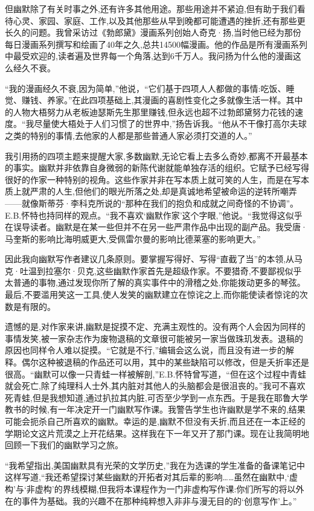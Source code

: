 但幽默除了有关时事之外,还有许多其他用途。那些用途并不紧迫,但有助于我们看待心灵、家园、家庭、工作,以及其他那些从早到晚都可能遭遇的挫折,还有那些更长久的问题。我曾采访过《勃郎黛》漫画系列创始人奇克·扬,当时他已经为那份每日漫画系列撰写和绘画了40年之久,总共14500幅漫画。他的作品是所有漫画系列中最受欢迎的,读者遍及世界每一个角落,达到6千万人。我问扬为什么他的漫画这么经久不衰。

“我的漫画经久不衰,因为简单,”他说，“它们基于四项人人都做的事情:吃饭、睡觉、赚钱、养家。”在此四项基础上,其漫画的喜剧性变化之多就像生活一样。其中的人物大梧努力从老板迪瑟斯先生那里赚钱,但永远也超不过勃郎黛努力花钱的速度。“我尽量使大梧处于人们习惯了的世界中,”扬告诉我。“他从不干像打高尔夫球之类的特别的事情,去他家的人都是那些普通人家必须打交道的人。”

我引用扬的四项主题来提醒大家,多数幽默,无论它看上去多么奇妙,都离不开最基本的事实。幽默并非依靠自身微弱的新陈代谢就能单独存活的组织。它赋予已经写得很好的作家一种特别的视角。这些作家并非在写本质上就可笑的人生，而是在写本质上就严肃的人生,但他们的眼光所落之处,却是真诚地希望被命运的逆转所嘲弄——就像斯蒂芬·李科克所说的“那种在我们的抱负和成就之间奇怪的不协调”。E.B.怀特也持同样的观点。“我不喜欢‘幽默作家’这个字眼,”他说。“我觉得这似乎在误导读者。幽默是在某一些但并不在另一些严肃作品中出现的副产品。我受唐·马奎斯的影响比海明威更大,受佩雷尔曼的影响比德莱塞的影响更大。”

因此我向幽默写作者建议几条原则。要掌握写得好、写得“直截了当”的本领,从马克·吐温到拉塞尔·贝克,这些幽默作家首先是超级作家。不要猎奇,不要鄙视似乎太普通的事物,通过发现你所了解的真实事件中的滑稽之处,你能拨动更多的琴弦。最后,不要滥用笑这一工具,使人发笑的幽默建立在惊诧之上,而你能使读者惊诧的次数是有限的。

遗憾的是,对作家来讲,幽默是捉摸不定、充满主观性的。没有两个人会因为同样的事情发笑,被一家杂志作为废物退稿的文章很可能被另一家当做珠玑发表。退稿的原因也同样令人难以捉摸。“它就是不行,”编辑会这么说，而且没有进一步的解释。偶尔这种被退稿的作品还可以用，其中的某些缺陷可以修改，但是夭折率还是很高。“幽默可以像一只青蛙一样被解剖,”E.B.怀特曾写道，“但在这个过程中青蛙就会死亡,除了纯理科人士外,其内脏对其他人的头脑都会是很沮丧的。”我可不喜欢死青蛙,但是我想知道,通过扒拉其内脏,可否至少学到一点东西。于是我在耶鲁大学教书的时候,有一年决定开一门幽默写作课。我警告学生也许幽默是学不来的,结果可能会扼杀自己所喜欢的幽默。幸运的是,幽默不但没有夭折,而且还在一本正经的学期论文这片荒漠之上开花结果。这样我在下一年又开了那门课。现在让我简明地回顾一下我们的幽默学习之旅。

“我希望指出,美国幽默具有光荣的文学历史,”我在为选课的学生准备的备课笔记中这样写道,“我还希望探讨某些幽默的开拓者对其后辈的影响……虽然在幽默中,‘虚构’与‘非虚构’的界线模糊,但我将本课程作为一门非虚构写作课:你们所写的将以外在的事件为基础。我的兴趣不在那种纯粹想入非非与漫无目的的‘创意写作’上。”

